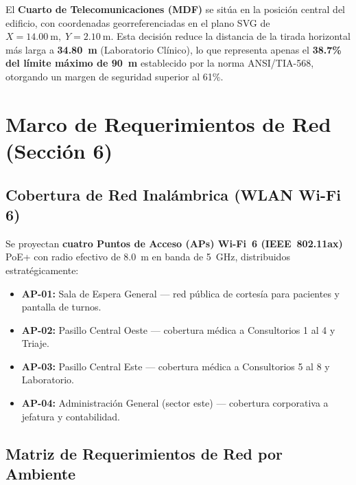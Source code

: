 El \textbf{Cuarto de Telecomunicaciones (MDF)} se sitúa en la posición central del edificio, con coordenadas georreferenciadas en el plano SVG de \(X = 14.00~\text{m},\; Y = 2.10~\text{m}\). Esta decisión reduce la distancia de la tirada horizontal más larga a \textbf{34.80~m} (Laboratorio Clínico), lo que representa apenas el \textbf{38.7\% del límite máximo de 90~m} establecido por la norma ANSI/TIA-568, otorgando un margen de seguridad superior al 61\%.

\section{Marco de Requerimientos de Red (Sección 6)}

\subsection{Cobertura de Red Inalámbrica (WLAN Wi-Fi 6)}

Se proyectan \textbf{cuatro Puntos de Acceso (APs) Wi-Fi~6 (IEEE~802.11ax)} PoE+ con radio efectivo de 8.0~m en banda de 5~GHz, distribuidos estratégicamente:

\begin{itemize}[leftmargin=*]
    \item \textbf{AP-01:} Sala de Espera General — red pública de cortesía para pacientes y pantalla de turnos.
    \item \textbf{AP-02:} Pasillo Central Oeste — cobertura médica a Consultorios 1 al 4 y Triaje.
    \item \textbf{AP-03:} Pasillo Central Este — cobertura médica a Consultorios 5 al 8 y Laboratorio.
    \item \textbf{AP-04:} Administración General (sector este) — cobertura corporativa a jefatura y contabilidad.
\end{itemize}

\subsection{Matriz de Requerimientos de Red por Ambiente}

